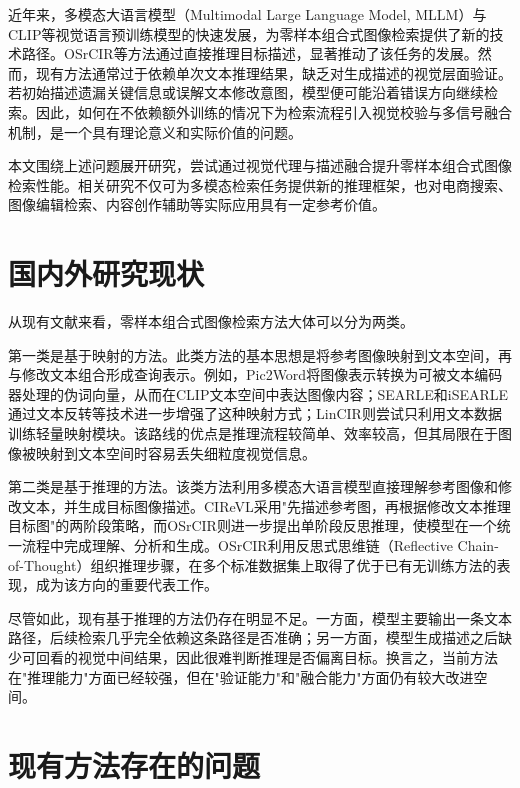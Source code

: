 \documentclass[12pt,a4paper,UTF8,oneside,openany]{ctexrep}
\begin{document}
近年来，多模态大语言模型（Multimodal Large Language Model, MLLM）与CLIP\cite{radford2021learning}等视觉语言预训练模型的快速发展，为零样本组合式图像检索提供了新的技术路径。OSrCIR\cite{tang2025reason}等方法通过直接推理目标描述，显著推动了该任务的发展。然而，现有方法通常过于依赖单次文本推理结果，缺乏对生成描述的视觉层面验证。若初始描述遗漏关键信息或误解文本修改意图，模型便可能沿着错误方向继续检索。因此，如何在不依赖额外训练的情况下为检索流程引入视觉校验与多信号融合机制，是一个具有理论意义和实际价值的问题。

本文围绕上述问题展开研究，尝试通过视觉代理与描述融合提升零样本组合式图像检索性能。相关研究不仅可为多模态检索任务提供新的推理框架，也对电商搜索、图像编辑检索、内容创作辅助等实际应用具有一定参考价值。

\section{国内外研究现状}

从现有文献来看，零样本组合式图像检索方法大体可以分为两类。

第一类是基于映射的方法。此类方法的基本思想是将参考图像映射到文本空间，再与修改文本组合形成查询表示。例如，Pic2Word\cite{saito2023pic2word}将图像表示转换为可被文本编码器处理的伪词向量，从而在CLIP文本空间中表达图像内容；SEARLE\cite{baldrati2023zero}和iSEARLE\cite{baldrati2025isearle}通过文本反转等技术进一步增强了这种映射方式；LinCIR\cite{gu2024lincir}则尝试只利用文本数据训练轻量映射模块。该路线的优点是推理流程较简单、效率较高，但其局限在于图像被映射到文本空间时容易丢失细粒度视觉信息。

第二类是基于推理的方法。该类方法利用多模态大语言模型直接理解参考图像和修改文本，并生成目标图像描述。CIReVL\cite{karthik2024vision}采用"先描述参考图，再根据修改文本推理目标图"的两阶段策略，而OSrCIR\cite{tang2025reason}则进一步提出单阶段反思推理，使模型在一个统一流程中完成理解、分析和生成。OSrCIR利用反思式思维链（Reflective Chain-of-Thought）组织推理步骤，在多个标准数据集上取得了优于已有无训练方法的表现，成为该方向的重要代表工作。

尽管如此，现有基于推理的方法仍存在明显不足。一方面，模型主要输出一条文本路径，后续检索几乎完全依赖这条路径是否准确；另一方面，模型生成描述之后缺少可回看的视觉中间结果，因此很难判断推理是否偏离目标。换言之，当前方法在"推理能力"方面已经较强，但在"验证能力"和"融合能力"方面仍有较大改进空间。

\section{现有方法存在的问题}
\end{document}
